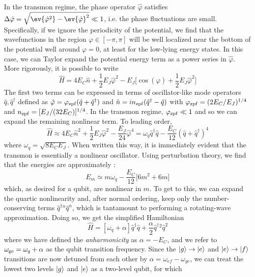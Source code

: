 In the transmon regime, the phase operator $\hat{\varphi}$ satisfies $\Delta\hat{\varphi} = \sqrt{\ev{\hat{\varphi}^2} - \ev{\hat{\varphi}}^2} \ll 1$, i.e. the phase fluctuations are small. Specifically, if we ignore the periodicity of the potential, we find that the wavefunctions in the region $\varphi \in [-\pi, \pi]$ will be well localized near the bottom of the potential well around $\varphi = 0$, at least for the low-lying energy states. In this case, we can Taylor expand the potential energy term as a power series in $\hat{\varphi}$. More rigorously, it is possible to write  
\begin{equation}
    \hat{H} = 4E_C\hat{n} + \frac{1}{2}E_J \hat{\varphi}^2 - E_J\bigg[\cos(\hat{\varphi}) + \frac{1}{2}E_J \hat{\varphi}^2\bigg]
\end{equation}
The first two terms can be expressed in terms of oscillator-like mode operators $\hat{q}, \hat{q}^\dagger$ defined as $\hat{\varphi} = \varphi_{\rm zpf}(\hat{q} + \hat{q}^\dagger)$ and $\hat{n} = in_{\rm zpf}(\hat{q}^\dagger - \hat{q})$ with $\varphi_{\rm zpf} = (2E_C/E_J)^{1/4}$ and $n_{\rm zpf} =  [E_J/(32E_C)]^{1/4}$. In the transmon regime, $\varphi_{\rm zpf} \ll 1$ and so we can expand the remaining nonlinear term. To leading order, 
\begin{equation}
    \hat{H} \approx 4E_C\hat{n}^2 + \frac{1}{2}E_J \hat{\varphi}^2 - \frac{E_J}{24}\hat{\varphi}^4 = \omega_q \hat{q}^\dagger \hat{q} - \frac{E_C}{12}(\hat{q} + \hat{q}^\dagger)^4
    \label{eq:transmon_duffing_H}
\end{equation}
where $\omega_q = \sqrt{8 E_C E_J}$. When written this way, it is immediately evident that the transmon is essentially a nonlinear oscillator. Using perturbation theory, we find that the energies are approximately \cite{bishop2010circuit}:
\begin{equation}
    E_m \simeq m\omega_q - \frac{E_C}{12}\big[6m^2 + 6m\big]
\end{equation}
which, as desired for a qubit, are nonlinear in $m$. To get to this, we can expand the quartic nonlinearity and, after normal ordering, keep only the number-conserving terms $\hat{q}^\dagger{}^n\hat{q}^n$, which is tantamount to performing a rotating-wave approximation. Doing so, we get the simplified Hamiltonian
\begin{equation}
    \hat{H} = [\omega_q + \alpha]\hat{q}^\dagger \hat{q} + \frac{\alpha}{2}\hat{q}^\dagger{}^2\hat{q}^2
\end{equation}
where we have defined the \textit{anharmonicity} as $\alpha = -E_C$, and we refer to $\omega_{\rm ge} = \omega_q + \alpha$ as the qubit transition frequency. Since the $\lvert g\rangle\to\lvert e\rangle$ and $\lvert e\rangle\to\lvert f\rangle$ transitions are now detuned from each other by $\alpha = \omega_{ef}-\omega_{ge}$, we can treat the lowest two levels $\lvert g\rangle$ and $\lvert e\rangle$ as a two-level qubit, for which
